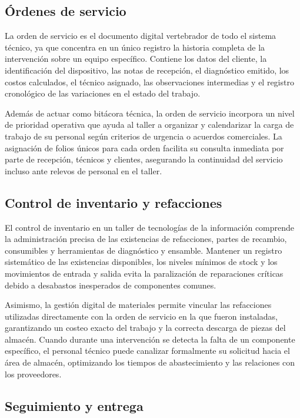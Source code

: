 \subsection{Órdenes de servicio}

La orden de servicio es el documento digital vertebrador de todo el sistema técnico, ya que concentra en un único registro la historia completa de la intervención sobre un equipo específico. Contiene los datos del cliente, la identificación del dispositivo, las notas de recepción, el diagnóstico emitido, los costos calculados, el técnico asignado, las observaciones intermedias y el registro cronológico de las variaciones en el estado del trabajo.

Además de actuar como bitácora técnica, la orden de servicio incorpora un nivel de prioridad operativa que ayuda al taller a organizar y calendarizar la carga de trabajo de su personal según criterios de urgencia o acuerdos comerciales. La asignación de folios únicos para cada orden facilita su consulta inmediata por parte de recepción, técnicos y clientes, asegurando la continuidad del servicio incluso ante relevos de personal en el taller.

\subsection{Control de inventario y refacciones}

El control de inventario en un taller de tecnologías de la información comprende la administración precisa de las existencias de refacciones, partes de recambio, consumibles y herramientas de diagnóstico y ensamble. Mantener un registro sistemático de las existencias disponibles, los niveles mínimos de stock y los movimientos de entrada y salida evita la paralización de reparaciones críticas debido a desabastos inesperados de componentes comunes.

Asimismo, la gestión digital de materiales permite vincular las refacciones utilizadas directamente con la orden de servicio en la que fueron instaladas, garantizando un costeo exacto del trabajo y la correcta descarga de piezas del almacén. Cuando durante una intervención se detecta la falta de un componente específico, el personal técnico puede canalizar formalmente su solicitud hacia el área de almacén, optimizando los tiempos de abastecimiento y las relaciones con los proveedores.

\subsection{Seguimiento y entrega}

